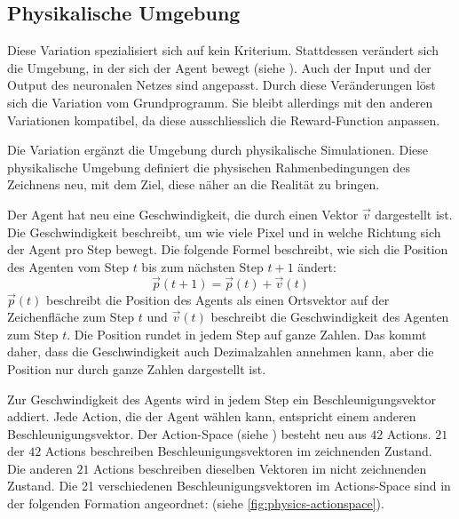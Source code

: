  
\subsection{Physikalische Umgebung}\label{sub:m_var_phy}
Diese Variation spezialisiert sich auf kein Kriterium. Stattdessen verändert
sich die Umgebung, in der sich der Agent bewegt (siehe
). Auch der Input und der Output des neuronalen Netzes
sind angepasst. Durch diese Veränderungen löst sich die Variation vom
Grundprogramm. Sie bleibt allerdings mit den anderen Variationen kompatibel, da
diese ausschliesslich die Reward-Function anpassen.
 
Die Variation ergänzt die Umgebung durch physikalische Simulationen. Diese
physikalische Umgebung definiert die physischen Rahmenbedingungen des Zeichnens
neu, mit dem Ziel, diese näher an die Realität zu bringen.
 
Der Agent hat neu eine Geschwindigkeit, die durch einen Vektor $\vec{v}$
dargestellt ist. Die Geschwindigkeit beschreibt, um wie viele Pixel und in
welche Richtung sich der Agent pro Step bewegt. Die folgende Formel beschreibt,
wie sich die Position des Agenten vom Step $t$ bis zum nächsten Step $t+1$
ändert:
\[ \vec{p}(t+1) = \vec{p}(t) + \vec{v}(t) \]
$\vec{p}(t)$ beschreibt die Position des Agents als einen Ortsvektor auf der
Zeichenfläche zum Step $t$ und $\vec{v}(t)$ beschreibt die Geschwindigkeit des
Agenten zum Step $t$. Die Position rundet in jedem Step auf ganze Zahlen. Das
kommt daher, dass die Geschwindigkeit auch Dezimalzahlen annehmen kann, aber die
Position nur durch ganze Zahlen dargestellt ist.
 
Zur Geschwindigkeit des Agents wird in jedem Step ein Beschleunigungsvektor
addiert. Jede Action, die der Agent wählen kann, entspricht einem anderen
Beschleunigungsvektor. Der Action-Space (siehe )
besteht neu aus $42$ Actions. $21$ der $42$ Actions beschreiben
Beschleunigungsvektoren im zeichnenden Zustand. Die anderen $21$ Actions
beschreiben dieselben Vektoren im nicht zeichnenden Zustand. Die 21
verschiedenen Beschleunigungsvektoren im Actions-Space sind in der folgenden
Formation angeordnet: (siehe \autoref{fig:physics-actionspace}).
 
